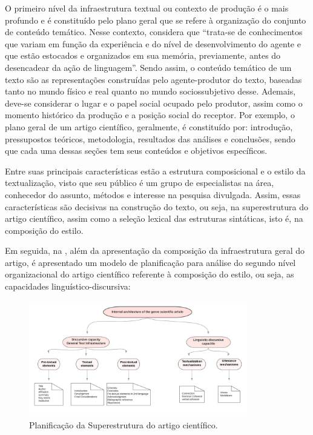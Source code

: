 \documentclass[portuguese]{textolivre}
\begin{document}
O primeiro nível da infraestrutura textual ou contexto de produção é o mais profundo e é constituído pelo plano geral que se refere à organização do conjunto de conteúdo temático. Nesse contexto, \textcite[p. 97/98]{bronckart_atividade_1999} considera que “trata-se de conhecimentos que variam em função da experiência e do nível de desenvolvimento do agente e que estão estocados e organizados em sua memória, previamente, antes do desencadear da ação de linguagem”. Sendo assim, o conteúdo temático de um texto são as representações construídas pelo agente-produtor do texto, baseadas tanto no mundo físico e real quanto no mundo sociossubjetivo desse. Ademais, deve-se considerar o lugar e o papel social ocupado pelo produtor, assim como o momento histórico da produção e a posição social do receptor. Por exemplo, o plano geral de um artigo científico, geralmente, é constituído por: introdução, pressupostos teóricos, metodologia, resultados das análises e conclusões, sendo que cada uma dessas seções tem seus conteúdos e objetivos específicos.

Entre suas principais características estão a estrutura composicional e o estilo da textualização, visto que seu público é um grupo de especialistas na área, conhecedor do assunto, métodos e interesse na pesquisa divulgada. Assim, essas características são decisivas na construção do texto, ou seja, na superestrutura do artigo científico, assim como a seleção lexical das estruturas sintáticas, isto é, na composição do estilo.

Em seguida, na , além da apresentação da composição da infraestrutura geral do artigo, é apresentado um modelo de planificação para análise do segundo nível organizacional do artigo científico referente à composição do estilo, ou seja, as capacidades linguístico-discursiva:

\begin{figure}[htbp]
 \centering
 \includegraphics[width=0.85\textwidth]{Fig2.png}
 \caption{Planificação da Superestrutura do artigo científico.}
 \label{fig-02}
\end{figure}
\end{document}
